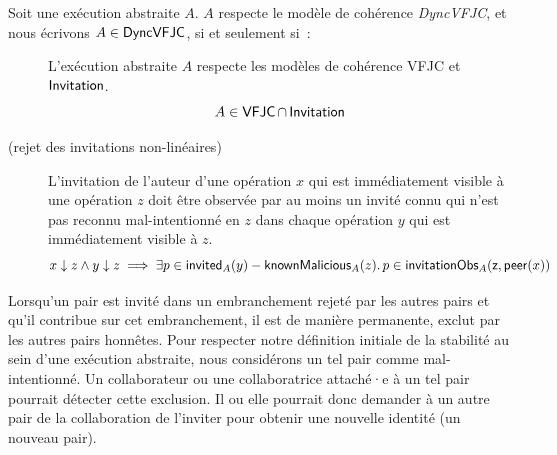 \begin{definition}[DynVFJC]\label{def:svfjc-consistency}
Soit une exécution abstraite $A$. $A$ respecte le modèle de cohérence \emph{DyncVFJC}, et nous écrivons $A \in \operatorname{\mathsf{DyncVFJC}}$, si et seulement si~:
\begin{description}
  \item[]
  L'exécution abstraite $A$ respecte les modèles de cohérence \acs{VFJC} et $\operatorname{\mathsf{Invitation}}$.
  \begin{equation*}
    A \in \operatorname{\mathsf{VFJC}} \cap \operatorname{\mathsf{Invitation}}
  \end{equation*}
  
  \item[ (rejet des invitations non-linéaires)]
  L'invitation de l'auteur d'une opération $x$ qui est immédiatement visible à une opération $z$ doit être observée par au moins un invité connu qui n'est pas reconnu mal-intentionné en $z$ dans chaque opération $y$ qui est immédiatement visible à $z$.
  \begin{equation*}
      x \downarrow z \land y \downarrow z \implies \exists p \in \operatorname{\mathsf{invited}}_A(y) - \operatorname{\mathsf{knownMalicious}}_A(z) \ldotp p \in \operatorname{\mathsf{invitationObs}}_A(\operatorname{\mathsf{z, peer}}(x))
  \end{equation*}
  \end{description}
\end{definition}

Lorsqu'un pair est invité dans un embranchement rejeté par les autres pairs et qu'il contribue sur cet embranchement, il est de manière permanente, exclut par les autres pairs honnêtes.
Pour respecter notre définition initiale de la stabilité au sein d'une exécution abstraite, nous considérons un tel pair comme mal-intentionné.
Un collaborateur ou une collaboratrice attaché·e à un tel pair pourrait détecter cette exclusion.
Il ou elle pourrait donc demander à un autre pair de la collaboration de l'inviter pour obtenir une nouvelle identité (un nouveau pair).

